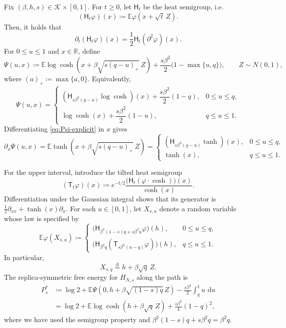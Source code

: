 \documentclass[11pt]{article}
\numberwithin{equation}{section}
\newcommand{\E}{\mathbb{E}}
\newcommand{\1}{\mathbf 1}
\newcommand{\cK}{\mathcal K}
\newcommand{\dd}{\,\mathrm d}
\begin{document}
Fix $(\beta,h,s)\in\cK\times[0,1]$.
For $t\ge0$, let $\mathsf H_t$ be the heat semigroup, i.e. 
\[
 (\mathsf H_t\varphi)(x)\coloneqq\E\varphi(x+\sqrt t\,Z) .
\]
Then, it holds that
\begin{equation}\label{eq:genH}
\partial _t (\mathsf H_t\varphi)(x) = \frac{1}{2} \mathsf H_t (\partial ^2 \varphi)(x) .
\end{equation}
For $0\le u\le1$ and $x\in\mathbb R$, define
\begin{equation}
 \Psi(u,x)
 \coloneqq
 \E\log\cosh\left(
 x+\beta\sqrt{s(q-u)_+}\,Z
 \right)
 +\frac{s\beta^2}{2}\bigl(1-\max\{u,q\}\bigr),
 \qquad Z\sim N(0,1),
 \label{eq:Psi-explicit}
\end{equation}
where $(a)_+\coloneqq\max\{a,0\}$.  Equivalently,
\[
 \Psi(u,x)
 =
 \begin{cases}
  (\mathsf H_{s\beta^2(q-u)}\log\cosh)(x)
  +\dfrac{s\beta^2}{2}(1-q),
  &0\le u\le q,\\[2mm]
  \log\cosh(x)+\dfrac{s\beta^2}{2}(1-u),
  &q\le u\le1.
 \end{cases}
\]
Differentiating \eqref{eq:Psi-explicit} in $x$ gives
\begin{equation}
 \partial_x\Psi(u,x)
 =
 \E\tanh\left(
 x+\beta\sqrt{s(q-u)_+}\,Z
 \right)
 =
 \begin{cases}
  (\mathsf H_{s\beta^2(q-u)}\tanh)(x),
      &0\le u\le q,\\
  \tanh(x),&q\le u\le1.
 \end{cases}
 \label{eq:Psi-x}
\end{equation}

For the upper interval, introduce the tilted heat semigroup
\begin{equation}
 (\mathsf T_t\varphi)(x)
 \coloneqq e^{-t/2}
 \frac{\bigl(\mathsf H_t
   (\varphi \cdot \cosh )\bigr)(x)}{\cosh(x)}.
 \label{eq:tiltedsemigroup}
\end{equation}
Differentiation under the Gaussian integral shows that its generator is
$\frac12\partial_{xx}+\tanh(x)\partial_x$.  For each $u\in[0,1]$,
let $X_{s,u}$ denote a random variable whose law is specified by
\begin{equation}
 \E\varphi(X_{s,u})
 \coloneqq
 \begin{cases}
  \bigl(\mathsf H_{\beta^2(1-s)q+s\beta^2u}\varphi\bigr)(h),
      &0\le u\le q,\\[1mm]
  \bigl(\mathsf H_{\beta^2q}
      (\mathsf T_{s\beta^2(u-q)}\varphi)\bigr)(h),
      &q\le u\le1.
 \end{cases}
 \label{eq:localfieldlaw}
\end{equation}
In particular,
\begin{equation}\label{eq:Xsq}
X_{s,q}\stackrel{\mathrm d}=h+\beta\sqrt q\,Z.
\end{equation}
The replica-symmetric free energy for $H_{N,s}$ along the path is
\begin{align}
 P_s^*& \coloneqq\log2+
 \E\Psi(0,h+\beta\sqrt{(1-s)q}\,Z)
 -\frac{s\beta^2}{2}\int_q^1u\,\dd u
 \label{eq:scalartrial}\\
 &= \log2+\E\log\cosh(h+\beta\sqrt q\,Z)
 +\frac{s\beta^2}{4}(1-q)^2,
 \label{eq:RSpathvalue}
\end{align}
where we have used the semigroup property and
$\beta^2(1-s)q+s\beta^2q=\beta^2q$.
\end{document}
